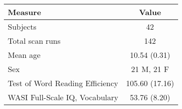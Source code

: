 \begin{tabular}{lc}
\toprule
Measure &               Value \\
\midrule
Subjects                        &              42 \\
Total scan runs                 &             142 \\
Mean age                        &    10.54 (0.31) \\
Sex                             &      21 M, 21 F \\
Test of Word Reading Efficiency &  105.60 (17.16) \\
WASI Full-Scale IQ, Vocabulary  &    53.76 (8.20) \\
\bottomrule
\end{tabular}